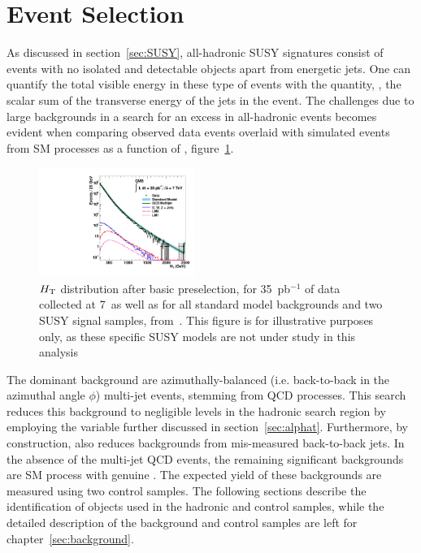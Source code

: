 \clearpage
\section{Event Selection\label{sec:eventSelection}}

As discussed in section~\ref{sec:SUSY}, all-hadronic SUSY signatures consist of events with
no isolated and detectable objects apart from energetic jets. One can quantify the
total visible energy in these type of events with the quantity, \scalht, the scalar sum of 
the transverse energy of the jets in the event. The challenges due to large
backgrounds in a search for an excess in all-hadronic events becomes evident 
when comparing observed data events overlaid with simulated events from 
SM processes as a function of \scalht, figure~\ref{fig:HT-distribution}.

\begin{figure}[h!t]
  \begin{center}
      \includegraphics[width=0.45\textwidth,]{figures/data-mc/AllcombinedHT_all.pdf}
      \caption{\label{fig:ht} $\mbox{$H_\text{T}$}$ distribution after basic preselection,
           for 35~pb$^{-1}$ of data collected at {7}~\tev as well as for all 
           standard model backgrounds and two SUSY signal samples, from~\cite{RA1Paper}. 
           This figure is for illustrative purposes only, as these specific SUSY 
           models are not under study in this analysis}
    \label{fig:HT-distribution}
  \end{center}
\end{figure}

The dominant background are azimuthally-balanced (i.e. back-to-back in the azimuthal angle 
$\phi$) multi-jet events, stemming from QCD processes. This search reduces this background 
to negligible levels in the hadronic search region by employing the \alphat variable further 
discussed in section~\ref{sec:alphat}. Furthermore, by construction, \alphat also reduces 
backgrounds from mis-measured back-to-back jets. In the absence of the multi-jet QCD events,
the remaining significant backgrounds are SM process with genuine \met. The expected 
yield of these backgrounds are measured using two control samples. The following sections
describe the identification of objects used in the hadronic and control samples, while the 
detailed description of the background and control samples are left for 
chapter~\ref{sec:background}.

